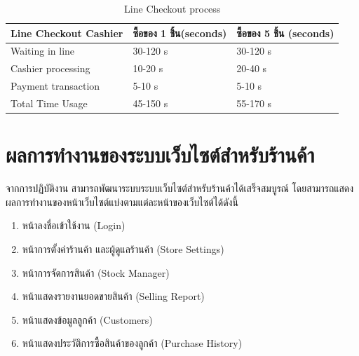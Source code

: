 \begin{table}[h]
    \centering
    \caption{Line Checkout process}
    \begin{tabular}{|p{5cm}|p{4cm}|p{4cm}|}
        \hline
        \textbf{Line Checkout Cashier} & \textbf{ซื้อของ 1 ชิ้น(seconds)} & \textbf{ซื้อของ 5 ชิ้น (seconds)} \\
        \hline
        Waiting in line                & 30-120 s                     & 30-120 s                      \\
        Cashier processing             & 10-20 s                      & 20-40 s                       \\
        Payment transaction            & 5-10 s                       & 5-10 s                        \\
        \hline
        Total Time Usage               & 45-150 s                     & 55-170 s                      \\
        \hline
    \end{tabular}
\end{table}

\newpage
\section{ผลการทำงานของระบบเว็บไซต์สำหรับร้านค้า}
จากการปฏิบัติงาน สามารถพัฒนาระบบระบบเว็บไซต์สำหรับร้านค้าได้เสร็จสมบูรณ์ โดยสามารถแสดงผลการทำงานของหน้าเว็บไซต์แบ่งตามแต่ละหน้าของเว็บไซต์ได้ดังนี้
\begin{enumerate}
    \item หน้าลงชื่อเข้าใช้งาน (Login)
    \item หน้าการตั้งค่าร้านค้า และผู้ดูแลร้านค้า (Store Settings)
    \item หน้าการจัดการสินค้า (Stock Manager)
    \item หน้าแสดงรายงานยอดขายสินค้า (Selling Report)
    \item หน้าแสดงข้อมูลลูกค้า (Customers)
    \item หน้าแสดงประวัติการซื้อสินค้าของลูกค้า (Purchase History)
\end{enumerate}

